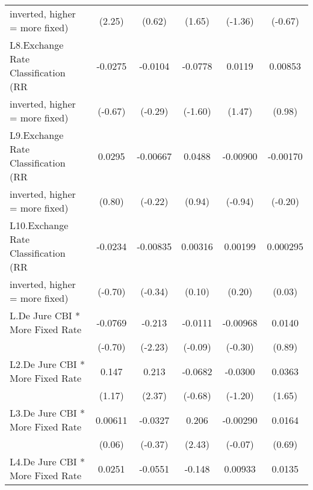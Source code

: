 {\begin{tabular}{l*{5}{c}}
inverted, higher = more fixed)          &    (2.25)         &    (0.62)         &    (1.65)         &   (-1.36)         &   (-0.67)         \\
\addlinespace
L8.Exchange Rate Classification (RR     &   -0.0275         &   -0.0104         &   -0.0778         &    0.0119         &   0.00853         \\
inverted, higher = more fixed)          &   (-0.67)         &   (-0.29)         &   (-1.60)         &    (1.47)         &    (0.98)         \\
\addlinespace
L9.Exchange Rate Classification (RR     &    0.0295         &  -0.00667         &    0.0488         &  -0.00900         &  -0.00170         \\
inverted, higher = more fixed)          &    (0.80)         &   (-0.22)         &    (0.94)         &   (-0.94)         &   (-0.20)         \\
\addlinespace
L10.Exchange Rate Classification (RR    &   -0.0234         &  -0.00835         &   0.00316         &   0.00199         &  0.000295         \\
inverted, higher = more fixed)          &   (-0.70)         &   (-0.34)         &    (0.10)         &    (0.20)         &    (0.03)         \\
\addlinespace
L.De Jure CBI * More Fixed Rate         &   -0.0769         &    -0.213\sym{*}  &   -0.0111         &  -0.00968         &    0.0140         \\
                                        &   (-0.70)         &   (-2.23)         &   (-0.09)         &   (-0.30)         &    (0.89)         \\
\addlinespace
L2.De Jure CBI * More Fixed Rate        &     0.147         &     0.213\sym{*}  &   -0.0682         &   -0.0300         &    0.0363         \\
                                        &    (1.17)         &    (2.37)         &   (-0.68)         &   (-1.20)         &    (1.65)         \\
\addlinespace
L3.De Jure CBI * More Fixed Rate        &   0.00611         &   -0.0327         &     0.206\sym{*}  &  -0.00290         &    0.0164         \\
                                        &    (0.06)         &   (-0.37)         &    (2.43)         &   (-0.07)         &    (0.69)         \\
\addlinespace
L4.De Jure CBI * More Fixed Rate        &    0.0251         &   -0.0551         &    -0.148         &   0.00933         &    0.0135         \\

\end{tabular}}
